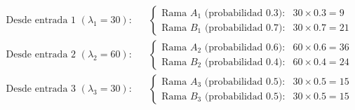 \documentclass{article}
\begin{document}
\begin{align*}
\text{Desde entrada 1 }(\lambda_1 = 30): &\quad 
\begin{cases}
\text{Rama \(A_1\) (probabilidad 0.3):} & 30 \times 0.3 = 9 \\
\text{Rama \(B_1\) (probabilidad 0.7):} & 30 \times 0.7 = 21
\end{cases} \\
\text{Desde entrada 2 }(\lambda_2 = 60): &\quad 
\begin{cases}
\text{Rama \(A_2\) (probabilidad 0.6):} & 60 \times 0.6 = 36 \\
\text{Rama \(B_2\) (probabilidad 0.4):} & 60 \times 0.4 = 24
\end{cases} \\
\text{Desde entrada 3 }(\lambda_3 = 30): &\quad 
\begin{cases}
\text{Rama \(A_3\) (probabilidad 0.5):} & 30 \times 0.5 = 15 \\
\text{Rama \(B_3\) (probabilidad 0.5):} & 30 \times 0.5 = 15
\end{cases}
\end{align*}
\end{document}

